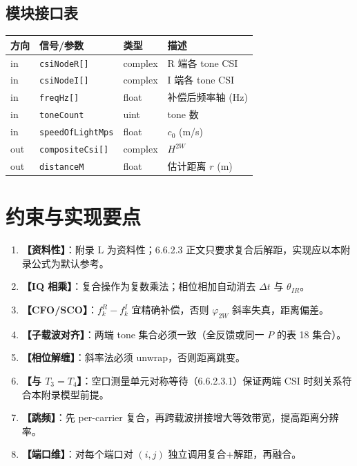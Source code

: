 \documentclass[11pt,a4paper]{ctexart}
\begin{document}
\subsection{模块接口表}

\begin{table}[h]
\centering
\small
\begin{tabular}{llll}
\toprule
\textbf{方向} & \textbf{信号/参数} & \textbf{类型} & \textbf{描述} \\
\midrule
in & \texttt{csiNodeR[]} & complex & R 端各 tone CSI \\
in & \texttt{csiNodeI[]} & complex & I 端各 tone CSI \\
in & \texttt{freqHz[]} & float & 补偿后频率轴 (Hz) \\
in & \texttt{toneCount} & uint & tone 数 \\
in & \texttt{speedOfLightMps} & float & $c_0$ (m/s) \\
out & \texttt{compositeCsi[]} & complex & $H^{2W}$ \\
out & \texttt{distanceM} & float & 估计距离 $r$ (m) \\
\bottomrule
\end{tabular}
\end{table}

\section{约束与实现要点}

\begin{enumerate}[nosep]
  \item \textbf{【资料性】}：附录 L 为资料性；6.6.2.3 正文只要求复合后解距，实现应以本附录公式为默认参考。
  \item \textbf{【IQ 相乘】}：复合操作为复数乘法；相位相加自动消去 $\Delta t$ 与 $\theta_{IR}$。
  \item \textbf{【CFO/SCO】}：$f_k^{R}-f_k^{I}$ 宜精确补偿，否则 $\varphi_{2W}$ 斜率失真，距离偏差。
  \item \textbf{【子载波对齐】}：两端 tone 集合必须一致（全反馈或同一 $P$ 的表 18 集合）。
  \item \textbf{【相位解缠】}：斜率法必须 unwrap，否则距离跳变。
  \item \textbf{【与 $T_3=T_4$】}：空口测量单元对称等待（6.6.2.3.1）保证两端 CSI 时刻关系符合本附录模型前提。
  \item \textbf{【跳频】}：先 per-carrier 复合，再跨载波拼接增大等效带宽，提高距离分辨率。
  \item \textbf{【端口维】}：对每个端口对 $(i,j)$ 独立调用复合+解距，再融合。
\end{enumerate}
\end{document}
